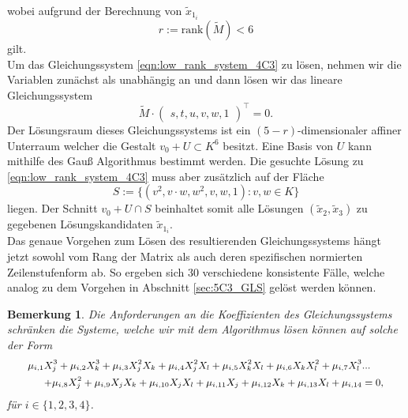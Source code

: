 \documentclass[a4paper,oneside, 11pt, openany%
]{article}
\newcommand{\coloneqq}{:=}
\theoremstyle{custom}
\theoremstyle{custom}
\newtheorem{remark}[theorem]{Bemerkung}
\begin{document}
wobei aufgrund der Berechnung von $\tilde{x}_{1_{i}}$ 
\begin{equation*}
	r \coloneqq \text{rank}(\tilde{M}) < 6
\end{equation*} gilt.\\
Um das Gleichungssystem \eqref{eqn:low_rank_system_4C3} zu lösen, nehmen wir die Variablen zunächst als unabhängig an und dann lösen wir das lineare Gleichungssystem
\begin{equation}\label{eqn:low_rank_system_ind_4C3}
	\tilde{M} \cdot \begin{pmatrix}
		s,
		t,
		u,
		v,
		w,
		1
	\end{pmatrix}^{\top}
	=0.
\end{equation}
Der Lösungsraum dieses Gleichungssystems ist ein $(5-r)$-dimensionaler affiner Unterraum welcher die Gestalt ${v_0 + U \subset K^6}$ besitzt. Eine Basis von $U$ kann mithilfe des Gauß Algorithmus bestimmt werden. Die gesuchte Lösung zu \eqref{eqn:low_rank_system_4C3} muss aber zusätzlich auf der Fläche \begin{equation*}
	{S \coloneqq \{(v^2,v\cdot w,w^2,v,w,1) : v,w \in K\}}
\end{equation*} liegen. Der Schnitt $v_0 + U \cap S $ beinhaltet somit alle Lösungen $(\tilde{x}_{2},\tilde{x}_{3})$ zu gegebenen Lösungskandidaten $\tilde{x}_{1_{i}}$.\\
Das genaue Vorgehen zum Lösen des resultierenden Gleichungssystems hängt jetzt sowohl vom Rang der Matrix als auch deren spezifischen normierten Zeilenstufenform ab. So ergeben sich $30$ verschiedene konsistente Fälle, welche analog zu dem Vorgehen in Abschnitt \ref{sec:5C3_GLS} gelöst werden können.

\begin{remark}
	Die Anforderungen an die Koeffizienten des Gleichungssystems schränken die Systeme, welche wir mit dem Algorithmus lösen können auf solche der Form
	\begin{equation}
		\small
		\begin{alignedat}{1}
			\mu_{i,1}X_{j}^3+\mu_{i,2}X_{k}^3+\mu_{i,3}X_{j}^2X_{k}+\mu_{i,4}X_{j}^2X_{l}+\mu_{i,5}X_{k}^2X_{l}+\mu_{i,6}X_{k}X_{l}^2+\mu_{i,7}X_{l}^3&...\\
			+\mu_{i,8}X_{j}^2+\mu_{i,9}X_{j}X_{k}+\mu_{i,10}X_{j}X_{l}+\mu_{i,11}X_{j}+\mu_{i,12}X_{k}+\mu_{i,13}X_{l}+\mu_{i,14} &= 0,
		\end{alignedat}
	\end{equation}
	für $i \in \{1,2,3,4\}$.
\end{remark}
\end{document}
